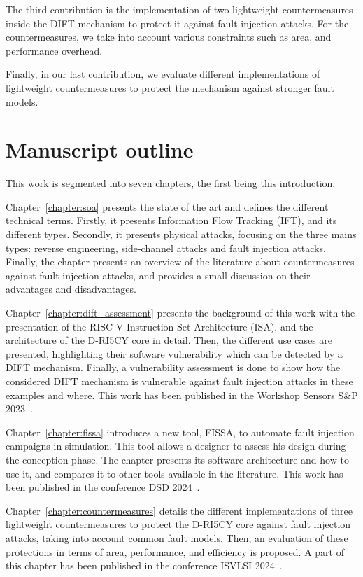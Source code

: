 The third contribution is the implementation of two lightweight countermeasures inside the DIFT mechanism to protect it against fault injection attacks. For the countermeasures, we take into account various constraints such as area, and performance overhead.

Finally, in our last contribution, we evaluate different implementations of lightweight countermeasures to protect the mechanism against stronger fault models.


\section{Manuscript outline}

This work is segmented into seven chapters, the first being this introduction.

Chapter~\ref{chapter:soa} presents the state of the art and defines the different technical terms. Firstly, it presents Information Flow Tracking (IFT), and its different types.
Secondly, it presents physical attacks, focusing on the three mains types: reverse engineering, side-channel attacks and fault injection attacks.
Finally, the chapter presents an overview of the literature about countermeasures against fault injection attacks, and provides a small discussion on their advantages and disadvantages.

Chapter~\ref{chapter:dift_assessment} presents the background of this work with the presentation of the RISC-V Instruction Set Architecture (ISA), and the architecture of the D-RI5CY core in detail. Then, the different use cases are presented, highlighting their software vulnerability which can be detected by a DIFT mechanism. Finally, a vulnerability assessment is done to show how the considered DIFT mechanism is vulnerable against fault injection attacks in these examples and where. This work has been published in the Workshop Sensors S\&P 2023~\cite{PLG-22-SensorsSP}.

Chapter~\ref{chapter:fissa} introduces a new tool, FISSA, to automate fault injection campaigns in simulation. This tool allows a designer to assess his design during the conception phase. The chapter presents its software architecture and how to use it, and compares it to other tools available in the literature. This work has been published in the conference DSD 2024~\cite{PLG-24-dsd}.

Chapter~\ref{chapter:countermeasures} details the different implementations of three lightweight countermeasures to protect the D-RI5CY core against fault injection attacks, taking into account common fault models. Then, an evaluation of these protections in terms of area, performance, and efficiency is proposed. A part of this chapter has been published in the conference ISVLSI 2024~\cite{PRLG-24-isvlsi}.

